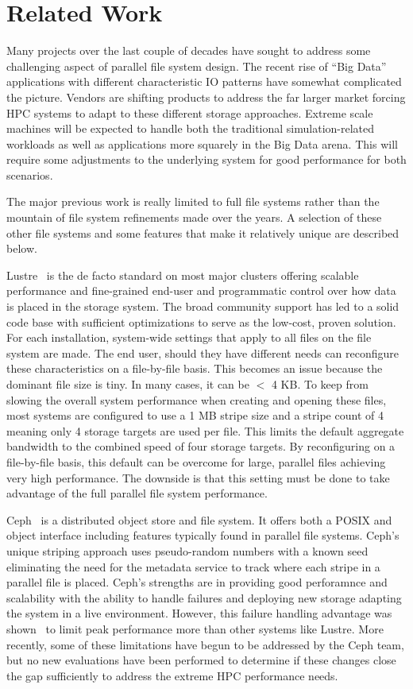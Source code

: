 \documentclass[conference]{IEEEtran} \pdfpagewidth=8.5in
\begin{document}
\section{Related Work}
\label{sec:related}

Many projects over the last couple of decades have sought to address some
challenging aspect of parallel file system design. The recent rise of ``Big
Data'' applications with different characteristic IO patterns have somewhat
complicated the picture. Vendors are shifting products to address the far
larger market forcing HPC systems to adapt to these different storage
approaches. Extreme scale machines will be expected to handle both the
traditional simulation-related workloads as well as applications more
squarely in the Big Data arena. This will require some adjustments to the
underlying system for good performance for both scenarios.

The major previous work is really limited to full file systems rather than the
mountain of file system refinements made over the years. A selection of these
other file systems and some features that make it relatively unique are
described below.

Lustre~\cite{braam:lustre-arch} is the de facto standard on most major clusters
offering scalable performance and fine-grained end-user and programmatic
control over how data is placed in the storage system. The broad community
support has led to a solid code base with sufficient optimizations to serve as
the low-cost, proven solution. For each installation, system-wide settings that
apply to all files on the file system are made. The end user, should they have
different needs can reconfigure these characteristics on a file-by-file basis.
This becomes an issue because the dominant file size is tiny. In many cases, it
can be $<$ 4 KB.  To keep from slowing the overall system performance when
creating and opening these files, most systems are configured to use a 1 MB
stripe size and a stripe count of 4 meaning only 4 storage targets are used per
file. This limits the default aggregate bandwidth to the combined speed of four
storage targets. By reconfiguring on a file-by-file basis, this default can be
overcome for large, parallel files achieving very high performance. The
downside is that this setting must be done to take advantage of the full
parallel file system performance.

Ceph~\cite{weil:ceph} is a distributed object store and file system. It offers
both a POSIX and object interface including features typically found in
parallel file systems. Ceph's unique striping approach uses pseudo-random
numbers with a known seed eliminating the need for the metadata service to
track where each stripe in a parallel file is placed. Ceph's strengths are in
providing good perforamnce and scalability with the ability to handle failures
and deploying new storage adapting the system in a live environment. However,
this failure handling advantage was shown~\cite{wang:2013:ceph} to limit peak
performance more than other systems like Lustre.  More recently, some of these
limitations have begun to be addressed by the Ceph team, but no new evaluations
have been performed to determine if these changes close the gap sufficiently to
address the extreme HPC performance needs.
\end{document}
